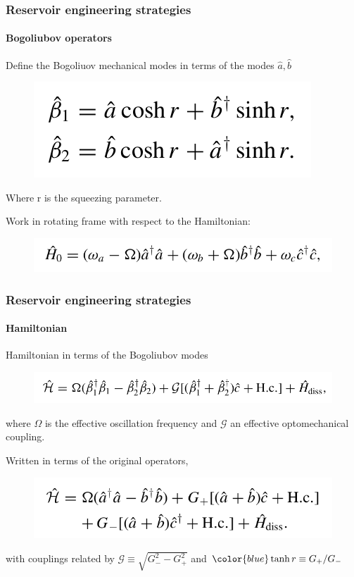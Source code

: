 \documentclass[aspectratio=43]{beamer}
\begin{document}
\begin{frame}
	
	\frametitle{Reservoir engineering strategies}
	\framesubtitle{Bogoliubov operators}
	
	Define the {\color{blue}Bogoliuov} mechanical modes in terms of the modes $\hat{a}, \hat{b}$
	\begin{figure}
		\includegraphics[width = 4.5 cm]{plots/bogoliubov_1.png}
	\end{figure}	

	Where r is the {\color{blue}squeezing parameter}.
	
	\vspace{0.5 cm}

	Work in rotating frame with respect to the Hamiltonian:
	\begin{figure}
		\includegraphics[width = 8 cm]{plots/hamiltonian_2.png}
	\end{figure}

\end{frame}

\begin{frame}
	
	\frametitle{Reservoir engineering strategies}
	\framesubtitle{Hamiltonian}
	
	Hamiltonian in terms of the Bogoliubov modes
	\begin{figure}
		\includegraphics[width = 8.5 cm]{plots/hamiltonian_3.png}
	\end{figure}	
	
	where $\Omega$ is the effective oscillation frequency and $\mathcal{G}$ an effective optomechanical coupling.
	
	\vspace{0.5 cm}
	
	Written in terms of the original operators,
	\begin{figure}
		\includegraphics[width = 7.5 cm]{plots/hamiltonian_4.png}
	\end{figure}
	
	with couplings related by $\mathcal{G} \equiv \sqrt{G_{-}^{2} - G_{+}^{2}}$ and ${\color{blue}\tanh r \equiv G_{+}/G_{-}}$

\end{frame}
\end{document}
